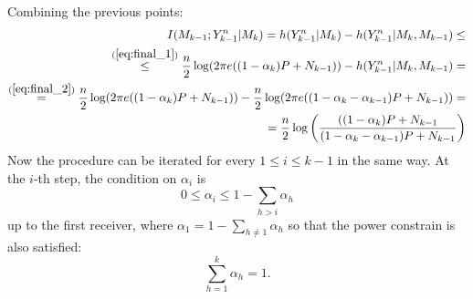 Combining the previous points:
\begin{align}
  \begin{split}
    I(M_{k-1};Y^n_{k-1}|M_k) = h(Y_{k-1}^n|M_{k}) - h(Y_{k-1}^n|M_k,M_{k-1})\leq\\
    \overset{(\ref{eq:final_1})}{\leq} \frac{n}{2}\log(2\pi e ((1-\alpha_k) P+N_{k-1})) - h(Y_{k-1}^n|M_k,M_{k-1}) =\\
    \overset{(\ref{eq:final_2})}{=}\frac{n}{2}\log(2\pi e ((1-\alpha_k) P+N_{k-1}))-\frac{n}{2}\log(2\pi e ((1-\alpha_k-\alpha_{k-1}) P+N_{k-1}))=\\
    = \frac{n}{2}\log\left(\frac{((1-\alpha_k) P+N_{k-1}}{(1-\alpha_k-\alpha_{k-1}) P+N_{k-1}}\right)
  \end{split}
  \label{eq:final_k-1}
\end{align}
Now the procedure can be iterated for every $1\leq i\leq k-1$ in the same way. At the $i$-th step, the condition on $\alpha_i$ is
\begin{equation}
  0\leq \alpha_i \leq 1-\sum_{h>i}\alpha_h
\end{equation}
up to the first receiver, where $\alpha_1 = 1-\sum_{h\neq 1}\alpha_h$ so that the power constrain is also satisfied:
\begin{equation}
\sum_{h = 1}^k \alpha_h = 1.
\end{equation}

